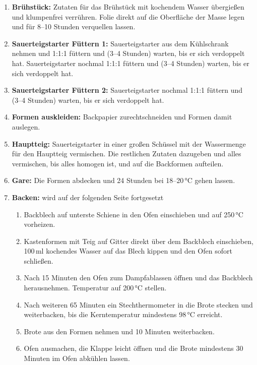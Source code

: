 \begin{enumerate}[label=\textbf{\arabic*.}, leftmargin=1.8em, itemsep=1em, topsep=0pt]
    \item \textbf{Brühstück:} Zutaten für das Brühstück mit kochendem Wasser übergießen und klumpenfrei verrühren. Folie direkt auf die Oberfläche der Masse legen und für 8--10 Stunden verquellen lassen.
    
    \item \textbf{Sauerteigstarter Füttern 1:} Sauerteigstarter aus dem Kühlschrank nehmen und 1:1:1 füttern und (3--4 Stunden) warten, bis er sich verdoppelt hat. Sauerteigstarter nochmal 1:1:1 füttern und (3--4 Stunden) warten, bis er sich verdoppelt hat.
    
    \item \textbf{Sauerteigstarter Füttern 2:} Sauerteigstarter nochmal 1:1:1 füttern und (3--4 Stunden) warten, bis er sich verdoppelt hat.

     \item \textbf{Formen auskleiden:} Backpapier zurechtschneiden und Formen damit auslegen.
   
    \item \textbf{Hauptteig:} Sauerteigstarter in einer großen Schüssel mit der Wassermenge für den Hauptteig vermischen. Die restlichen Zutaten dazugeben und alles vermischen, bis alles homogen ist, und auf die Backformen aufteilen.
    
    \item \textbf{Gare:} Die Formen abdecken und 24 Stunden bei 18--20\,°C gehen lassen.
    
    \item \textbf{Backen:} wird auf der folgenden Seite fortgesetzt
    \begin{enumerate}
    	\item Backblech auf unterste Schiene in den Ofen einschieben und auf 250\,°C vorheizen.
    	\item Kastenformen mit Teig auf Gitter direkt über dem Backblech einschieben, 100\,ml kochendes Wasser auf das Blech kippen und den Ofen sofort schließen.
    	\item Nach 15 Minuten den Ofen zum Dampfablassen öffnen und das Backblech herausnehmen. Temperatur auf 200\,°C stellen.
    	\item Nach weiteren 65 Minuten ein Stechthermometer in die Brote stecken und weiterbacken, bis die Kerntemperatur mindestens 98\,°C erreicht.
    	\item Brote aus den Formen nehmen und 10 Minuten weiterbacken.
    	\item Ofen ausmachen, die Klappe leicht öffnen und die Brote mindestens 30 Minuten im Ofen abkühlen lassen.
    \end{enumerate}
         
\end{enumerate}

